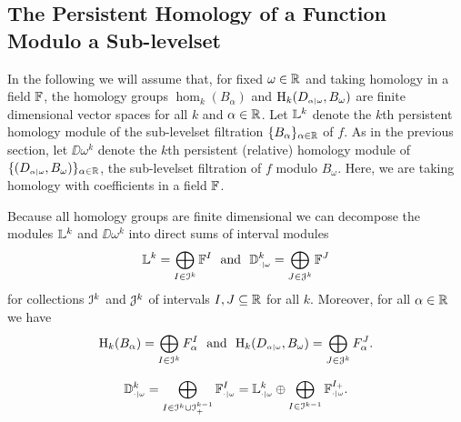 \subsection{The Persistent Homology of a Function Modulo a Sub-levelset}

In the following we will assume that, for fixed $\omega\in\mathbb{R}$ and taking homology in a field $\mathbb{F}$, the homology groups $\hom_k(B_\alpha)$ and $\mathrm{H}_k(D_{\scriptscriptstyle \alpha\mid \omega}, B_\omega)$ are finite dimensional vector spaces for all $k$ and $\alpha\in\mathbb{R}$.
Let $\mathbb{L}^k$ denote the $k$th persistent homology module of the sub-levelset filtration $\{B_\alpha\}_{\alpha\in\mathbb{R}}$ of $f$.
As in the previous section, let $\DD{\omega}^k$ denote the $k$th persistent (relative) homology module of $\{(D_{\scriptscriptstyle \alpha\mid \omega},B_\omega)\}_{\alpha\in\mathbb{R}}$, the sub-levelset filtration of $f$ modulo $B_\omega$.
Here, we are taking homology with coefficients in a field $\mathbb{F}$.

Because all homology groups are finite dimensional we can decompose the modules $\mathbb{L}^k$ and $\DD{\omega}^k$ into direct sums of interval modules
\[ \mathbb{L}^k = \bigoplus_{I\in\mathcal{I}^k} \mathbb{F}^I\ \text{ and }\ \mathbb{D}_{\scriptscriptstyle \cdot\mid \omega}^k = \bigoplus_{J\in\mathcal{J}^k} \mathbb{F}^J\]
for collections $\mathcal{I}^k$ and $\mathcal{J}^k$ of intervals $I,J\subseteq \mathbb{R}$ for all $k$.
Moreover, for all $\alpha\in\mathbb{R}$ we have
\[ \mathrm{H}_k(B_\alpha) = \bigoplus_{I\in \mathcal{I}^k}F_\alpha^I\ \text{ and }\ \mathrm{H}_k(D_{\scriptscriptstyle \alpha\mid \omega}, B_\omega) = \bigoplus_{J\in\mathcal{J}^k} F_\alpha^J.\]

\begin{lemma}
  \[\mathbb{D}_{\scriptscriptstyle \cdot\mid \omega}^k = \bigoplus_{I\in\mathcal{I}^k \cup \mathcal{I}^{k-1}_+} \mathbb{F}_{\scriptscriptstyle \cdot\mid \omega}^I = \mathbb{L}_{\scriptscriptstyle \cdot\mid \omega}^k \oplus \bigoplus_{I\in \mathcal{I}^{k-1}} \mathbb{F}_{\scriptscriptstyle \cdot\mid \omega}^{I_+}.\]
\end{lemma}

